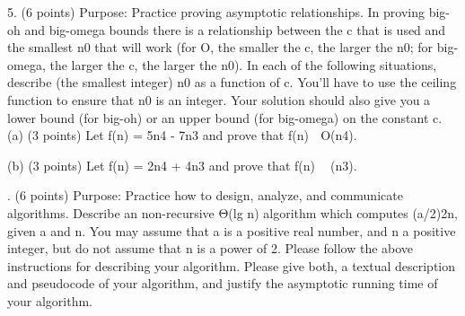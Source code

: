 \documentclass[12pt]{article}
\newenvironment{question}[2][Question]{\begin{trivlist}
		\item[\hskip \labelsep {\bfseries #1}\hskip \labelsep {\bfseries #2.}]}{\end{trivlist}}
\begin{document}
\begin{question}{5a}	
		5. (6 points) Purpose: Practice proving asymptotic relationships. In proving big-oh and big-omega bounds there is a relationship between the c that is used and the smallest n0 that will work (for O, the smaller the c, the larger the n0; for big-omega, the larger the c, the larger the n0). In each of the following situations, describe (the smallest integer) n0 as a function of c. You'll have to use the ceiling function to ensure that n0 is an integer. Your solution should also give you a lower bound (for big-oh) or an upper bound (for big-omega) on the constant c.
		(a) (3 points) Let f(n) = 5n4 - 7n3 and prove that f(n)  O(n4).
			\end{question}
	
\begin{question}{5b}	
		(b) (3 points) Let f(n) = 2n4 + 4n3 and prove that f(n)  (n3).
			\end{question}
	
\begin{question}{6}	
		6. (6 points) Purpose: Practice how to design, analyze, and communicate algorithms. Describe an non-recursive Θ(lg n) algorithm which computes (a/2)2n, given a and n. You may assume that a is a positive real number, and n a positive integer, but do not assume that n is a power of 2. Please follow the above instructions for describing your algorithm. Please give both, a textual description and pseudocode of your algorithm, and justify the asymptotic running time of your algorithm.
		
		
	\end{question}
	
	\clearpage
	
	
	
\end{document}
